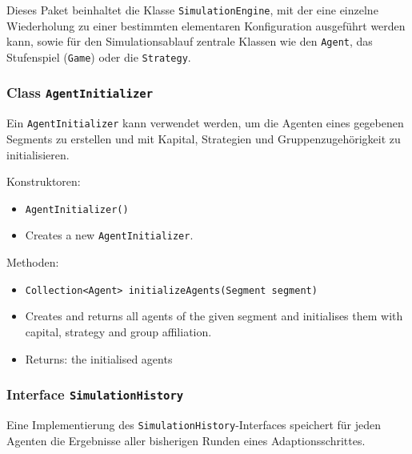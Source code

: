 \documentclass[parskip=full,11pt]{scrartcl}
\begin{document}
Dieses Paket beinhaltet die Klasse \texttt{SimulationEngine}, mit der eine einzelne Wiederholung zu einer bestimmten elementaren Konfiguration ausgeführt werden kann, sowie für den Simulationsablauf zentrale Klassen wie den \texttt{Agent}, das Stufenspiel (\texttt{Game}) oder die \texttt{Strategy}.

\subsubsection{Class \texttt{AgentInitializer}}
Ein \texttt{AgentInitializer} kann verwendet werden, um die Agenten eines gegebenen Segments zu erstellen und mit Kapital, Strategien und Gruppenzugehörigkeit zu initialisieren.

Konstruktoren:
\begin{itemize}\itemsep -10pt
\item \texttt{AgentInitializer()}
\item[] Creates a new \texttt{AgentInitializer}.
\end{itemize}

Methoden:
\begin{itemize}\itemsep -10pt
\item \texttt{Collection<Agent> initializeAgents(Segment segment)}
\item[] Creates and returns all agents of the given segment and initialises them with capital, strategy and group affiliation.
\item[] Returns: the initialised agents
\end{itemize}

\subsubsection{Interface \texttt{SimulationHistory}}
Eine Implementierung des \texttt{SimulationHistory}-Interfaces speichert für jeden Agenten die Ergebnisse aller bisherigen Runden eines Adaptionsschrittes.
\end{document}
